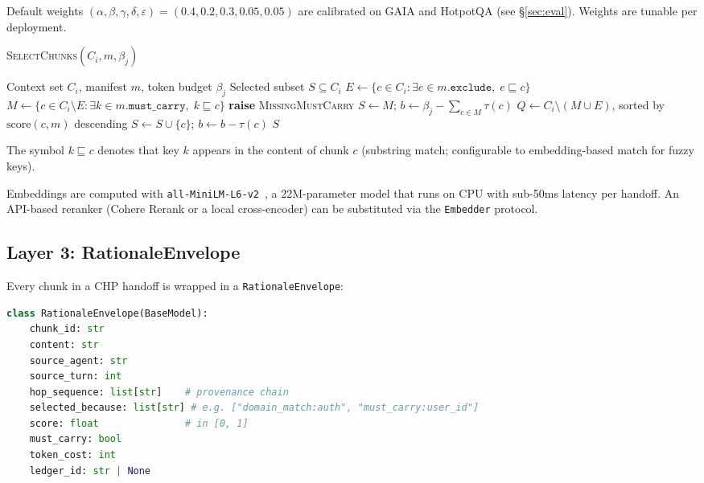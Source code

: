 \documentclass[11pt]{article}
\begin{document}
Default weights $(\alpha, \beta, \gamma, \delta, \varepsilon) =
(0.4, 0.2, 0.3, 0.05, 0.05)$ are calibrated on GAIA and HotpotQA
(see \S\ref{sec:eval}). Weights are tunable per deployment.

\begin{algorithm}
\caption{\textsc{SelectChunks}$(C_i, m, \beta_j)$}
\label{alg:select}
\begin{algorithmic}[1]
\Require Context set $C_i$, manifest $m$, token budget $\beta_j$
\Ensure Selected subset $S \subseteq C_i$
\State $E \gets \{c \in C_i : \exists e \in m.\mathtt{exclude},\; e \sqsubseteq c\}$
\State $M \gets \{c \in C_i \setminus E : \exists k \in m.\mathtt{must\_carry},\; k \sqsubseteq c\}$
  \State \textbf{raise} \textsc{MissingMustCarry}
\EndIf
\State $S \gets M$;\; $b \gets \beta_j - \sum_{c \in M} \tau(c)$
\State $Q \gets C_i \setminus (M \cup E)$, sorted by $\mathrm{score}(c, m)$ descending
    \State $S \gets S \cup \{c\}$;\; $b \gets b - \tau(c)$
  \EndIf
\EndFor
\State \Return $S$
\end{algorithmic}
\end{algorithm}

The symbol $k \sqsubseteq c$ denotes that key $k$ appears in the content
of chunk $c$ (substring match; configurable to embedding-based match for
fuzzy keys).

Embeddings are computed with
\texttt{all-MiniLM-L6-v2}~\cite{reimers2019sentence}, a 22M-parameter
model that runs on CPU with sub-50ms latency per handoff. An API-based
reranker (Cohere Rerank or a local cross-encoder) can be substituted
via the \texttt{Embedder} protocol.

\subsection{Layer 3: RationaleEnvelope}
\label{sec:rationale}

Every chunk in a CHP handoff is wrapped in a \texttt{RationaleEnvelope}:

\begin{lstlisting}[language=Python, caption={RationaleEnvelope schema}]
class RationaleEnvelope(BaseModel):
    chunk_id: str
    content: str
    source_agent: str
    source_turn: int
    hop_sequence: list[str]    # provenance chain
    selected_because: list[str] # e.g. ["domain_match:auth", "must_carry:user_id"]
    score: float               # in [0, 1]
    must_carry: bool
    token_cost: int
    ledger_id: str | None
\end{lstlisting}
\end{document}
